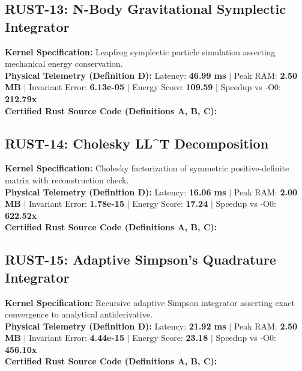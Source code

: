 \subsection{RUST-13: N-Body Gravitational Symplectic Integrator}
\textbf{Kernel Specification:} Leapfrog symplectic particle simulation asserting mechanical energy conservation.\\
\textbf{Physical Telemetry (Definition D):} Latency: \textbf{46.99 ms} $|$ Peak RAM: \textbf{2.50 MB} $|$ Invariant Error: \textbf{6.13e-05} $|$ Energy Score: \textbf{109.59} $|$ Speedup vs -O0: \textbf{212.79x}\\

\textbf{Certified Rust Source Code (Definitions A, B, C):}


\vspace{1em}
\subsection{RUST-14: Cholesky LL\textasciicircum{}T Decomposition}
\textbf{Kernel Specification:} Cholesky factorization of symmetric positive-definite matrix with reconstruction check.\\
\textbf{Physical Telemetry (Definition D):} Latency: \textbf{16.06 ms} $|$ Peak RAM: \textbf{2.00 MB} $|$ Invariant Error: \textbf{1.78e-15} $|$ Energy Score: \textbf{17.24} $|$ Speedup vs -O0: \textbf{622.52x}\\

\textbf{Certified Rust Source Code (Definitions A, B, C):}


\vspace{1em}
\subsection{RUST-15: Adaptive Simpson's Quadrature Integrator}
\textbf{Kernel Specification:} Recursive adaptive Simpson integrator asserting exact convergence to analytical antiderivative.\\
\textbf{Physical Telemetry (Definition D):} Latency: \textbf{21.92 ms} $|$ Peak RAM: \textbf{2.50 MB} $|$ Invariant Error: \textbf{4.44e-15} $|$ Energy Score: \textbf{23.18} $|$ Speedup vs -O0: \textbf{456.10x}\\

\textbf{Certified Rust Source Code (Definitions A, B, C):}


\vspace{1em}
